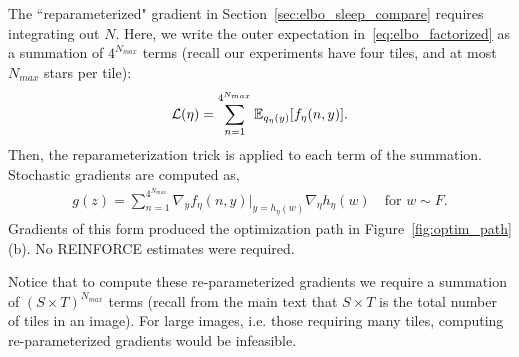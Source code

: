 The ``reparameterized" gradient in Section~\ref{sec:elbo_sleep_compare} requires integrating out $N$.
Here, we write the outer expectation in~\eqref{eq:elbo_factorized} as a summation of $4^{N_{max}}$ terms (recall our experiments have four tiles, and at most $N_{max}$ stars per tile):
\begin{align}
\mathcal{L}(\eta) = \sum_{n=1}^{4^{N_{max}}}\mathbb{E}_{q_\eta(y)}[f_\eta(n, y)].
\end{align}
Then, the reparameterization trick is applied to each term of the summation.
Stochastic gradients are computed as,
\begin{align}
g(z) = \sum_{n=1}^{4^{N_{max}}}\nabla_y f_\eta(n, y)\Big|_{y = h_\eta(w)}
\nabla_\eta h_\eta(w) \quad \text{for } w\sim F.
\end{align}
Gradients of this form produced the optimization path in Figure~\ref{fig:optim_path}(b).
No REINFORCE estimates were required. 

Notice that to compute these re-parameterized gradients we require 
a summation of $(S \times T)^{N_{max}}$ terms 
(recall from the main text that $S \times T$ is the total number 
of tiles in an image). 
For large images, i.e. those requiring many tiles, computing re-parameterized gradients would be infeasible. 

